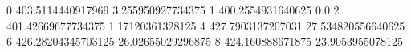 0 403.5114440917969 3.255950927734375
1 400.2554931640625 0.0
2 401.42669677734375 1.17120361328125
4 427.7903137207031 27.534820556640625
6 426.28204345703125 26.02655029296875
8 424.160888671875 23.9053955078125
